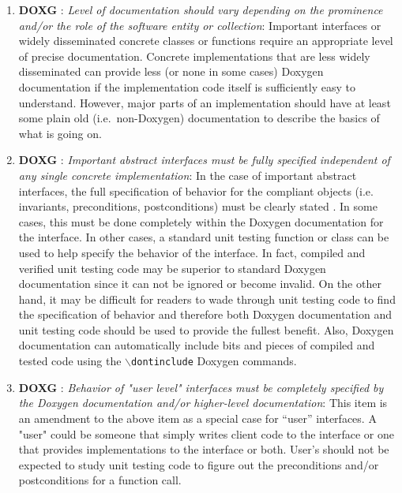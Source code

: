\begin{enumerate}

{}\item{}\textbf{DOXG }:
{}\textit{Level of documentation should vary depending on the prominence
and/or the role of the software entity or collection}: Important interfaces or
widely disseminated concrete classes or functions require an appropriate level
of precise documentation.  Concrete implementations that are less widely
disseminated can provide less (or none in some cases) Doxygen documentation if
the implementation code itself is sufficiently easy to understand.  However,
major parts of an implementation should have at least some plain old (i.e.\
non-Doxygen) documentation to describe the basics of what is going on.

{}\item{}\textbf{DOXG }:
{}\textit{Important abstract interfaces must be fully specified
independent of any single concrete implementation}: In the case of important
abstract interfaces, the full specification of behavior for the compliant
objects (i.e. invariants, preconditions, postconditions) must be clearly
stated {}\cite[Item 69]{C++CodingStandards05}.  In some cases, this must be
done completely within the Doxygen documentation for the interface.  In other
cases, a standard unit testing function or class can be used to help specify
the behavior of the interface.  In fact, compiled and verified unit testing
code may be superior to standard Doxygen documentation since it can not be
ignored or become invalid.  On the other hand, it may be difficult for readers
to wade through unit testing code to find the specification of behavior and
therefore both Doxygen documentation and unit testing code should be used to
provide the fullest benefit.  Also, Doxygen documentation can automatically
include bits and pieces of compiled and tested code using the
{}\texttt{$\backslash$dontinclude} Doxygen commands.

{}\item{}\textbf{DOXG }:
{}\textit{Behavior of "user level" interfaces must be completely
specified by the Doxygen documentation and/or higher-level documentation}:
This item is an amendment to the above item as a special case for ``user''
interfaces.  A "user" could be someone that simply writes client code to the
interface or one that provides implementations to the interface or both.
User's should not be expected to study unit testing code to figure out the
preconditions and/or postconditions for a function call.


\end{enumerate}
